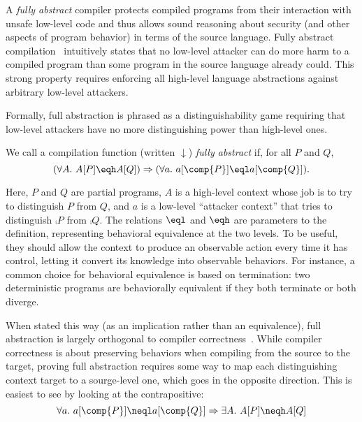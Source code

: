 \documentclass[10pt, conference, compsocconf, letterpaper, times]{IEEEtran}
\begin{document}
\label{sec:fa}

A {\em fully abstract} compiler protects compiled programs from their interaction
with unsafe low-level code and thus allows sound reasoning about security
(and other aspects of program behavior) in terms of the source language.
Fully abstract compilation~\cite{abadi_protection98}
intuitively states that no
low-level attacker can do more harm to a compiled program than some
program in the source language already could.
This strong property requires enforcing all high-level language
abstractions against arbitrary low-level attackers.


Formally, full abstraction is phrased as a distinguishability game
requiring that low-level attackers have no more distinguishing
power than high-level ones.

\begin{defn}\label{defn:fa-simple}
We call a compilation function (written $\downarrow$) {\em fully abstract}
if, for all $P$ and $Q$,
\[
(\forall A.~ A[P] \eqh A[Q])
\Rightarrow (\forall a.~ a[\comp{P}] \eql a[\comp{Q}]).
\]
\end{defn}

\noindent Here, $P$ and $Q$ are partial programs, $A$ is a high-level
context whose job is to try to distinguish $P$ from $Q$, and $a$ is a
low-level ``attacker context'' that tries to distinguish $\comp{P}$ from
$\comp{Q}$.
The relations $\eql$ and $\eqh$ are parameters to the definition,
representing behavioral equivalence at the two levels.
To be useful, they should allow the context to produce an observable action
every time it has control, letting it convert its knowledge into
observable behaviors.
For instance, a common choice for behavioral equivalence is based on
termination: two deterministic programs are behaviorally equivalent if
they both terminate or both diverge.

When stated this way (as an implication rather than an equivalence),
full abstraction is largely orthogonal to compiler
correctness~\cite{leroy09:compcert, KumarMNO14}.
While compiler correctness is about preserving behaviors when
compiling from the source to the target, proving full abstraction
requires some way to map each distinguishing context target to a
sourge-level one, which goes in the opposite direction.
This is easiest to see by looking at the contrapositive:
\[
\forall a.~ a[\comp{P}] \neql a[\comp{Q}] \Rightarrow
\exists A.~ A[P] \neqh A[Q]
\]
\end{document}
